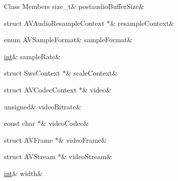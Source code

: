 \begin{DoxyFields}{Class Members}
\mbox{\label{ffmpeg-encoder_8h_ac47a8dc87a66aef7b173a54d255a909e}} 
size\_t&
postaudioBufferSize&
\\
\hline

\mbox{\label{ffmpeg-encoder_8h_a9fd1d422011eb713c61f00b5bcacf06b}} 
struct AVAudioResampleContext $\ast$&
resampleContext&
\\
\hline

\mbox{\label{ffmpeg-encoder_8h_aa5521d6ca540aadab33b4009709001d1}} 
enum AVSampleFormat&
sampleFormat&
\\
\hline

\mbox{\label{ffmpeg-encoder_8h_a2847def543ebc85ff36996e5c8d959e2}} 
\mbox{\hyperlink{ioapi_8h_a787fa3cf048117ba7123753c1e74fcd6}{int}}&
sampleRate&
\\
\hline

\mbox{\label{ffmpeg-encoder_8h_ac83da43779d4966b1b54caf78cc4e401}} 
struct SwsContext $\ast$&
scaleContext&
\\
\hline

\mbox{\label{ffmpeg-encoder_8h_adb72713d3738625197b7a5715c219dcc}} 
struct AVCodecContext $\ast$&
video&
\\
\hline

\mbox{\label{ffmpeg-encoder_8h_a8815cf61510db89a69d7097f483d7bcd}} 
unsigned&
videoBitrate&
\\
\hline

\mbox{\label{ffmpeg-encoder_8h_abf4560c2a19d336fe25f201002f9d95d}} 
const char $\ast$&
videoCodec&
\\
\hline

\mbox{\label{ffmpeg-encoder_8h_a29e915d63190978ddcd5e133bf37a178}} 
struct AVFrame $\ast$&
videoFrame&
\\
\hline

\mbox{\label{ffmpeg-encoder_8h_a3bbe0d968c59a2977d477124f7106ba8}} 
struct AVStream $\ast$&
videoStream&
\\
\hline

\mbox{\label{ffmpeg-encoder_8h_af2c388078193e01b3b60a7399c6085e7}} 
\mbox{\hyperlink{ioapi_8h_a787fa3cf048117ba7123753c1e74fcd6}{int}}&
width&
\\
\hline

\end{DoxyFields}


